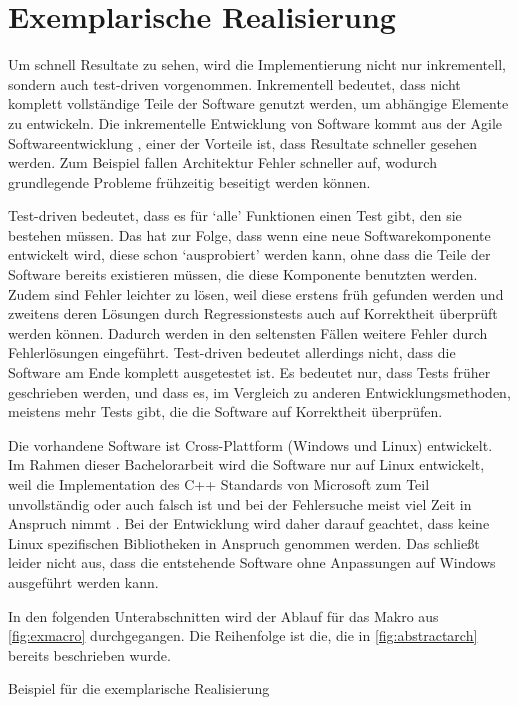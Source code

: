 \section{Exemplarische Realisierung}
\label{sec:Exemplarische Realisierung}
  Um schnell Resultate zu sehen, wird die Implementierung nicht nur inkrementell, sondern auch test-driven \autocite{beck2003test} vorgenommen. Inkrementell bedeutet, dass nicht komplett vollständige Teile der Software genutzt werden, um abhängige Elemente zu entwickeln. Die inkrementelle Entwicklung von Software kommt aus der Agile Softwareentwicklung \autocite{cohen2003agile}, einer der Vorteile ist, dass Resultate schneller gesehen werden. Zum Beispiel fallen Architektur Fehler schneller auf, wodurch grundlegende Probleme frühzeitig beseitigt werden können.

  Test-driven bedeutet, dass es für `alle' Funktionen einen Test gibt, den sie bestehen müssen. Das hat zur Folge, dass wenn eine neue Softwarekomponente entwickelt wird, diese schon `ausprobiert' werden kann, ohne dass die Teile der Software bereits existieren müssen, die diese Komponente benutzten werden. Zudem sind Fehler leichter zu lösen, weil diese erstens früh gefunden werden und zweitens deren Lösungen durch Regressionstests auch auf Korrektheit überprüft werden können. Dadurch werden in den seltensten Fällen weitere Fehler durch Fehlerlösungen eingeführt. Test-driven bedeutet allerdings nicht, dass die Software am Ende komplett ausgetestet ist. Es bedeutet nur, dass Tests früher geschrieben werden, und dass es, im Vergleich zu anderen Entwicklungsmethoden, meistens mehr Tests gibt, die die Software auf Korrektheit überprüfen.

  Die vorhandene Software ist Cross-Plattform (Windows und Linux) entwickelt. Im Rahmen dieser Bachelorarbeit wird die Software nur auf Linux entwickelt, weil die Implementation des C++ Standards von Microsoft zum Teil unvollständig oder auch falsch ist und bei der Fehlersuche meist viel Zeit in Anspruch nimmt \autocite{new-ms-compiler}. Bei der Entwicklung wird daher darauf geachtet, dass keine Linux spezifischen Bibliotheken in Anspruch genommen werden. Das schließt leider nicht aus, dass die entstehende Software ohne Anpassungen auf Windows ausgeführt werden kann.

  In den folgenden Unterabschnitten wird der Ablauf für das Makro aus \autoref{fig:exmacro} durchgegangen. Die Reihenfolge ist die, die in \autoref{fig:abstractarch} bereits beschrieben wurde.
  \begin{myCodeEnv}
    \centering
    \begin{myInvBox}[width=.9\linewidth]
      
    \end{myInvBox}
    \caption{Beispiel für die exemplarische Realisierung}
    \label{fig:exmacro}
  \end{myCodeEnv}

